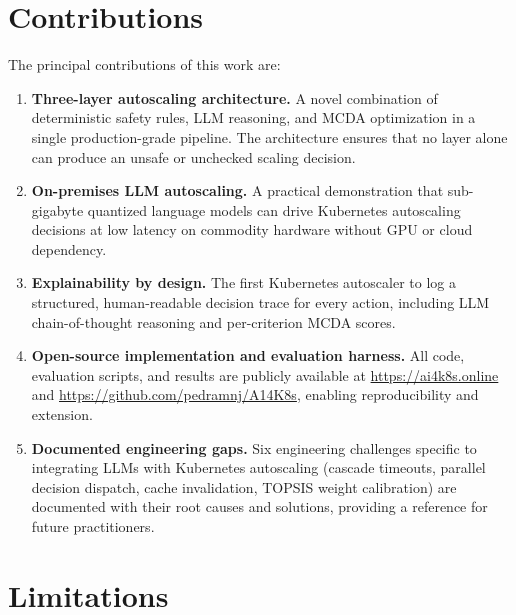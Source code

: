 \section{Contributions}
\label{sec:contributions-ch6}

The principal contributions of this work are:

\begin{enumerate}
  \item \textbf{Three-layer autoscaling architecture.} A novel combination of
  deterministic safety rules, LLM reasoning, and MCDA optimization in a single
  production-grade pipeline. The architecture ensures that no layer alone can
  produce an unsafe or unchecked scaling decision.

  \item \textbf{On-premises LLM autoscaling.} A practical demonstration that
  sub-gigabyte quantized language models can drive Kubernetes autoscaling
  decisions at low latency on commodity hardware without GPU or cloud dependency.

  \item \textbf{Explainability by design.} The first Kubernetes autoscaler to
  log a structured, human-readable decision trace for every action, including
  LLM chain-of-thought reasoning and per-criterion MCDA scores.

  \item \textbf{Open-source implementation and evaluation harness.} All code,
  evaluation scripts, and results are publicly available at
  \url{https://ai4k8s.online} and \url{https://github.com/pedramnj/A14K8s},
  enabling reproducibility and extension.

  \item \textbf{Documented engineering gaps.} Six engineering challenges
  specific to integrating LLMs with Kubernetes autoscaling (cascade timeouts,
  parallel decision dispatch, cache invalidation, TOPSIS weight calibration)
  are documented with their root causes and solutions, providing a reference
  for future practitioners.
\end{enumerate}

\section{Limitations}
\label{sec:limitations}


